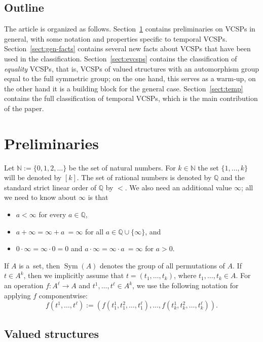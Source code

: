 \documentclass[preprint,12pt]{elsarticle}
\newcommand{\N}{\mathbb N}
\newcommand{\Q}{\mathbb Q}
\DeclareMathOperator{\Sym}{Sym}
\begin{document}
\subsection{Outline} 
The article is organized as follows. Section~\ref{sect:prelims} contains preliminaries on VCSPs in general, with some notation and properties specific to temporal VCSPs. Section~\ref{sect:gen-facts} contains several new facts about VCSPs that have been used in the classification. Section~\ref{sect:evcsps} contains the classification of \emph{equality} VCSPs, that is, VCSPs of valued structures with an automorphism group equal to the full symmetric group; on the one hand, this serves as a warm-up, on the other hand it is a building block for the general case.  
Section~\ref{sect:temp} contains the full classification of temporal VCSPs, which is the main contribution of the paper.


\section{Preliminaries}
\label{sect:prelims}
Let ${\mathbb N} := \{0,1,2,\dots\}$ be the set of natural numbers.
For $k \in \N$ the set $\{1,\dots, k\}$ will be denoted by $[k]$. The set of rational numbers is denoted by $\Q$ and the standard strict linear order of $\Q$ by $<$.
We also need an additional value $\infty$; all
we need to know about $\infty$ is that
\begin{itemize}
\item $a < \infty$ for every $a \in {\mathbb Q}$,
\item $a + \infty = \infty + a~= \infty$ for all $a \in {\mathbb Q} \cup \{\infty\}$, and 
\item $0 \cdot \infty = 
\infty \cdot 0 = 0$
and $a \cdot \infty =
\infty \cdot a~= \infty$ for $a > 0$. 
 \end{itemize}

If $A$ is a~set, then $\Sym(A)$ denotes the group of all permutations of $A$. If  $t \in A^k$, then we implicitly assume that $t=(t_1, \dots, t_k)$, where $t_1,\dots,t_k \in A$. For an operation  $f \colon A^{\ell} \to A$ 
and $t^1, \dots,t^\ell \in A^k$, we
use the following notation for applying $f$ componentwise: 
\[ f(t^1, \dots, t^\ell) := (f(t^1_1, t^2_1, \dots, t^\ell_1), \ldots, f(t^1_k, t^2_k, \dots, t^\ell_k)).\]

 
\subsection{Valued structures}
\end{document}
